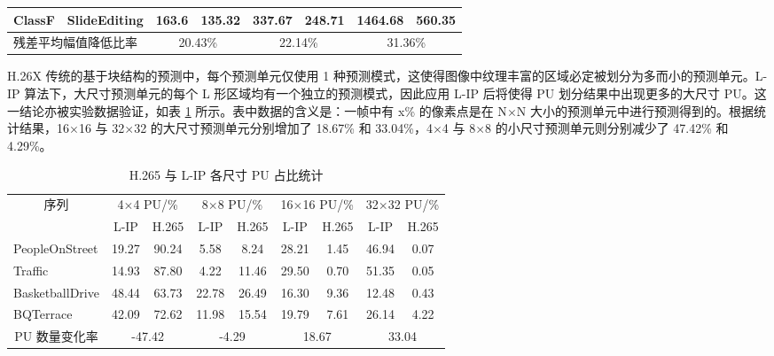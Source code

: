 \begin{table}[htb]
\begin{tabular}{@{}clcccccc@{}}
        ClassF                                   & SlideEditing                              & 163.6                             & 135.32                            & 337.67                              & 248.71 & 1464.68 & 560.35 \\ \midrule
        \multicolumn{2}{l}{残差平均幅值降低比率} & \multicolumn{2}{c}{20.43\%}               & \multicolumn{2}{c}{22.14\%}       & \multicolumn{2}{c}{31.36\%}                                                                         \\ \bottomrule
    \end{tabular}
\end{table}

H.26X 传统的基于块结构的预测中，每个预测单元仅使用 1 种预测模式，这使得图像中纹理丰富的区域必定被划分为多而小的预测单元。L-IP 算法下，大尺寸预测单元的每个 L 形区域均有一个独立的预测模式，因此应用 L-IP 后将使得 PU 划分结果中出现更多的大尺寸 PU。这一结论亦被实验数据验证，如表 \ref{tab:L-IPPUSize} 所示。表中数据的含义是：一帧中有 x\% 的像素点是在 N$\times$N 大小的预测单元中进行预测得到的。根据统计结果，16$\times$16 与 32$\times$32 的大尺寸预测单元分别增加了 18.67\% 和 33.04\%，4$\times$4 与 8$\times$8 的小尺寸预测单元则分别减少了 47.42\% 和 4.29\%。
\begin{table}[hbt]
    \centering
    \caption{H.265 与 L-IP 各尺寸 PU 占比统计}
    \label{tab:L-IPPUSize}
    \begin{tabular}{@{}lcccccccc@{}}
        \toprule
        \multicolumn{1}{c}{\multirow{2}{*}{序列}} &
        \multicolumn{2}{c}{4$\times$4 PU/\%}      &
        \multicolumn{2}{c}{8$\times$8 PU/\%}      &
        \multicolumn{2}{c}{16$\times$16 PU/\%}    &
        \multicolumn{2}{c}{32$\times$32 PU/\%}                                                                    \\ \cmidrule(l){2-9}
        \multicolumn{1}{c}{}                      & L-IP  & H.265 & L-IP  & H.265 & L-IP  & H.265 & L-IP  & H.265 \\ \midrule
        PeopleOnStreet                            & 19.27 & 90.24 & 5.58  & 8.24  & 28.21 & 1.45  & 46.94 & 0.07  \\
        Traffic                                   & 14.93 & 87.80 & 4.22  & 11.46 & 29.50 & 0.70  & 51.35 & 0.05  \\
        BasketballDrive                           & 48.44 & 63.73 & 22.78 & 26.49 & 16.30 & 9.36  & 12.48 & 0.43  \\
        BQTerrace                                 & 42.09 & 72.62 & 11.98 & 15.54 & 19.79 & 7.61  & 26.14 & 4.22  \\ \midrule
        \multicolumn{1}{c}{PU 数量变化率}         &
        \multicolumn{2}{c}{-47.42}                &
        \multicolumn{2}{c}{-4.29}                 &
        \multicolumn{2}{c}{18.67}                 &
        \multicolumn{2}{c}{33.04}                                                                                 \\ \bottomrule
    \end{tabular}
\end{table}

